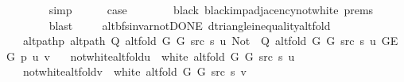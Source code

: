 \begin{isabellebody}
\ \ \ \ \ \ \isamarkupfalse%
\ simp{\isacharplus}{\kern0pt}\isanewline
\ \ \ \ \isamarkupfalse%
\ {\isacharquery}{\kern0pt}case\isanewline
\ \ \ \ \ \ \isamarkupfalse%
\ black\ black{\isacharunderscore}{\kern0pt}imp{\isacharunderscore}{\kern0pt}adjacency{\isacharunderscore}{\kern0pt}not{\isacharunderscore}{\kern0pt}white\ {\isachardoublequoteopen}{}{\isachardot}{\kern0pt}prems{\isachardoublequoteclose}{\isacharparenleft}{\kern0pt}{}{\isacharparenright}{\kern0pt}\isanewline
\ \ \ \ \ \ \isamarkupfalse%
\ blast\isanewline
\ \ \isamarkupfalse%
\isanewline
{}\isamarkupfalse%
%
\endisatagproof
{\isafoldproof}%
%
\isadelimproof
\isanewline
%
\endisadelimproof
\isanewline
{}\isamarkupfalse%
\ {\isacharparenleft}{\kern0pt}\ alt{\isacharunderscore}{\kern0pt}bfs{\isacharunderscore}{\kern0pt}invar{\isacharunderscore}{\kern0pt}not{\isacharunderscore}{\kern0pt}DONE{\isacharparenright}{\kern0pt}\ d{\isacharunderscore}{\kern0pt}triangle{\isacharunderscore}{\kern0pt}inequality{\isacharunderscore}{\kern0pt}alt{\isacharunderscore}{\kern0pt}fold{\isacharcolon}{\kern0pt}\isanewline
\ \ \ alt{\isacharunderscore}{\kern0pt}path{\isacharunderscore}{\kern0pt}p{\isacharcolon}{\kern0pt}\ {\isachardoublequoteopen}alt{\isacharunderscore}{\kern0pt}path\ {\isacharparenleft}{\kern0pt}Q\ {\isacharparenleft}{\kern0pt}alt{\isacharunderscore}{\kern0pt}fold\ G{}\ G{}\ src\ s{\isacharparenright}{\kern0pt}\ u{\isacharparenright}{\kern0pt}\ {\isacharparenleft}{\kern0pt}Not\ {\isasymcirc}\ Q\ {\isacharparenleft}{\kern0pt}alt{\isacharunderscore}{\kern0pt}fold\ G{}\ G{}\ src\ s{\isacharparenright}{\kern0pt}\ u{\isacharparenright}{\kern0pt}\ {\isacharparenleft}{\kern0pt}G{\isachardot}{\kern0pt}E\ G{\isacharparenright}{\kern0pt}\ p\ u\ v{\isachardoublequoteclose}\isanewline
\ \ \ not{\isacharunderscore}{\kern0pt}white{\isacharunderscore}{\kern0pt}alt{\isacharunderscore}{\kern0pt}fold{\isacharunderscore}{\kern0pt}u{\isacharcolon}{\kern0pt}\ {\isachardoublequoteopen}{\isasymnot}\ white\ {\isacharparenleft}{\kern0pt}alt{\isacharunderscore}{\kern0pt}fold\ G{}\ G{}\ src\ s{\isacharparenright}{\kern0pt}\ u{\isachardoublequoteclose}\isanewline
\ \ \ not{\isacharunderscore}{\kern0pt}white{\isacharunderscore}{\kern0pt}alt{\isacharunderscore}{\kern0pt}fold{\isacharunderscore}{\kern0pt}v{\isacharcolon}{\kern0pt}\ {\isachardoublequoteopen}{\isasymnot}\ white\ {\isacharparenleft}{\kern0pt}alt{\isacharunderscore}{\kern0pt}fold\ G{}\ G{}\ src\ s{\isacharparenright}{\kern0pt}\ v{\isachardoublequoteclose}\isanewline

\end{isabellebody}
